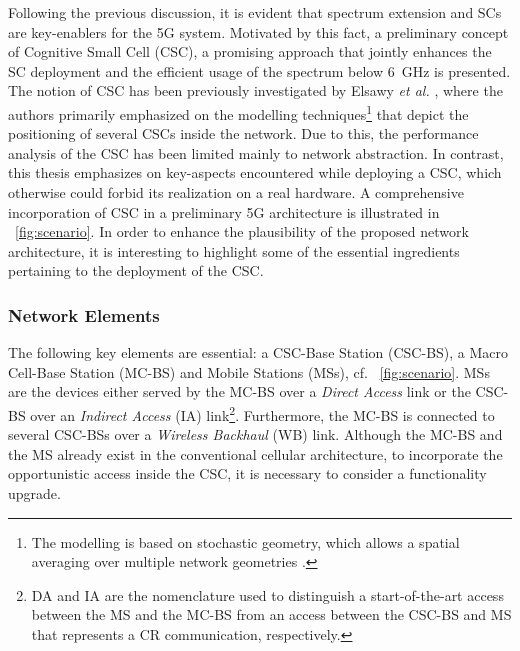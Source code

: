 Following the previous discussion, it is evident that spectrum extension and SCs are key-enablers for the 5G system.
Motivated by this fact, a preliminary concept of Cognitive Small Cell (CSC), a promising approach that jointly enhances the SC deployment and the efficient usage of the spectrum below \SI{6}{GHz} is presented. The notion of CSC has been previously investigated by Elsawy \textit{et al.} \cite{Elsawy13, Elsawy13_cmag}, where the authors primarily emphasized on the modelling techniques\footnote{The modelling is based on stochastic geometry, which allows a spatial averaging over multiple network geometries \cite{Haenggi, Haenggi08now}.} that depict the positioning of several CSCs inside the network. Due to this, the performance analysis of the CSC has been limited mainly to network abstraction. In contrast, this thesis emphasizes on key-aspects encountered while deploying a CSC, which otherwise could forbid its realization on a real hardware. %
 A comprehensive incorporation of CSC in a preliminary 5G architecture is illustrated in \figurename~\ref{fig:scenario}. In order to enhance the plausibility of the proposed network architecture, it is interesting to highlight some of the essential ingredients pertaining to the deployment of the CSC.

\subsubsection*{Network Elements}
 The following key elements are essential: a CSC-Base Station (CSC-BS), a Macro Cell-Base Station (MC-BS) and Mobile Stations (MSs), cf. \figurename~\ref{fig:scenario}. MSs are the devices either served by the MC-BS over a \textit{Direct Access} link or the CSC-BS over an \textit{Indirect Access} (IA) link\footnote{DA and IA are the nomenclature used to distinguish a start-of-the-art access between the MS and the MC-BS from an access between the CSC-BS and MS that represents a CR communication, respectively.}. Furthermore, the MC-BS is connected to several CSC-BSs over a \textit{Wireless Backhaul} (WB) link. Although the MC-BS and the MS already exist in the conventional cellular architecture, to incorporate the opportunistic access inside the CSC, it is necessary to consider a functionality upgrade.


